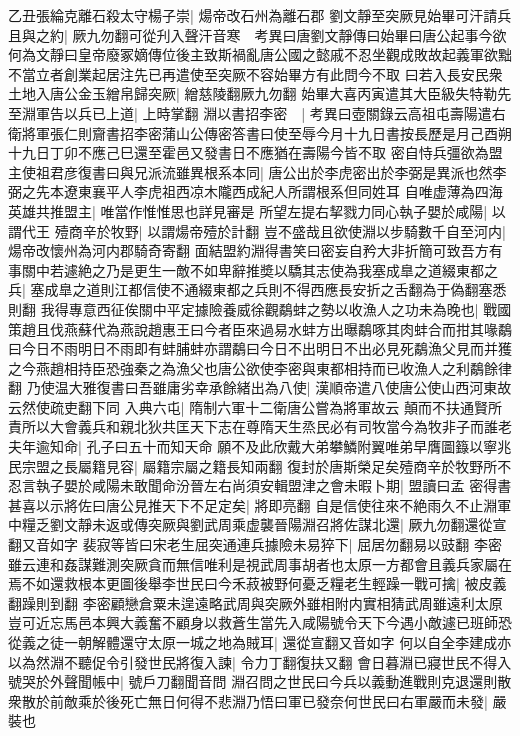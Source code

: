 乙丑張綸克離石殺太守楊子崇|{
	煬帝改石州為離石郡}
劉文靜至突厥見始畢可汗請兵且與之約|{
	厥九勿翻可從刋入聲汗音寒　考異曰唐劉文靜傳曰始畢曰唐公起事今欲何為文靜曰皇帝廢冢嫡傳位後主致斯禍亂唐公國之懿戚不忍坐觀成敗故起義軍欲黜不當立者創業起居注先已再遣使至突厥不容始畢方有此問今不取}
曰若入長安民衆土地入唐公金玉繒帛歸突厥|{
	繒慈陵翻厥九勿翻}
始畢大喜丙寅遣其大臣級失特勒先至淵軍告以兵已上道|{
	上時掌翻}
淵以書招李密　|{
	考異曰壺關錄云高祖屯壽陽遣右衛將軍張仁則齎書招李密蒲山公傳密答書曰使至辱今月十九日書按長歷是月己酉朔十九日丁卯不應己巳還至霍邑又發書日不應猶在壽陽今皆不取}
密自恃兵彊欲為盟主使祖君彦復書曰與兄派流雖異根系本同|{
	唐公出於李虎密出於李弼是異派也然李弼之先本遼東襄平人李虎祖西凉木隴西成紀人所謂根系但同姓耳}
自唯虚薄為四海英雄共推盟主|{
	唯當作惟惟思也詳見審是}
所望左提右挈戮力同心執子嬰於咸陽|{
	以謂代王}
殪商辛於牧野|{
	以謂煬帝殪於計翻}
豈不盛哉且欲使淵以步騎數千自至河内|{
	煬帝改懷州為河内郡騎奇寄翻}
面結盟約淵得書笑曰密妄自矜大非折簡可致吾方有事關中若遽絶之乃是更生一敵不如卑辭推奬以驕其志使為我塞成臯之道綴東都之兵|{
	塞成臯之道則江都信使不通綴東都之兵則不得西應長安折之舌翻為于偽翻塞悉則翻}
我得專意西征俟關中平定據險養威徐觀鷸蚌之勢以收漁人之功未為晚也|{
	戰國策趙且伐燕蘇代為燕說趙惠王曰今者臣來過易水蚌方出曝鷸啄其肉蚌合而拑其喙鷸曰今日不雨明日不雨即有蚌脯蚌亦謂鷸曰今日不出明日不出必見死鷸漁父見而并獲之今燕趙相持臣恐強秦之為漁父也唐公欲使李密與東都相持而已收漁人之利鷸餘律翻}
乃使温大雅復書曰吾雖庸劣幸承餘緒出為八使|{
	漢順帝遣八使唐公使山西河東故云然使疏吏翻下同}
入典六屯|{
	隋制六軍十二衛唐公嘗為將軍故云}
顛而不扶通賢所責所以大會義兵和親北狄共匡天下志在尊隋天生烝民必有司牧當今為牧非子而誰老夫年逾知命|{
	孔子曰五十而知天命}
願不及此欣戴大弟攀鱗附翼唯弟早膺圖籙以寧兆民宗盟之長屬籍見容|{
	屬籍宗屬之籍長知兩翻}
復封於唐斯榮足矣殪商辛於牧野所不忍言執子嬰於咸陽未敢聞命汾晉左右尚須安輯盟津之會未暇卜期|{
	盟讀曰孟}
密得書甚喜以示將佐曰唐公見推天下不足定矣|{
	將即亮翻}
自是信使往來不絶雨久不止淵軍中糧乏劉文靜未返或傳突厥與劉武周乘虚襲晉陽淵召將佐謀北還|{
	厥九勿翻還從宣翻又音如字}
裴寂等皆曰宋老生屈突通連兵據險未易猝下|{
	屈居勿翻易以豉翻}
李密雖云連和姦謀難測突厥貪而無信唯利是視武周事胡者也太原一方都會且義兵家屬在焉不如還救根本更圖後舉李世民曰今禾菽被野何憂乏糧老生輕躁一戰可擒|{
	被皮義翻躁則到翻}
李密顧戀倉粟未遑遠略武周與突厥外雖相附内實相猜武周雖遠利太原豈可近忘馬邑本興大義奮不顧身以救蒼生當先入咸陽號令天下今遇小敵遽已班師恐從義之徒一朝解體還守太原一城之地為賊耳|{
	還從宣翻又音如字}
何以自全李建成亦以為然淵不聽促令引發世民將復入諫|{
	令力丁翻復扶又翻}
會日暮淵已寢世民不得入號哭於外聲聞帳中|{
	號戶刀翻聞音問}
淵召問之世民曰今兵以義動進戰則克退還則散衆散於前敵乘於後死亡無日何得不悲淵乃悟曰軍已發奈何世民曰右軍嚴而未發|{
	嚴裝也}
